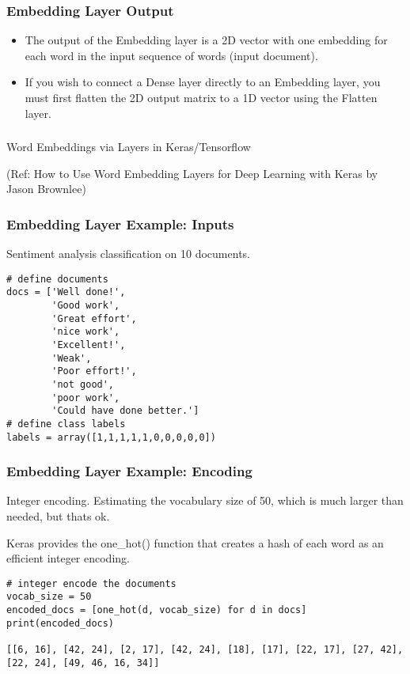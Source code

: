 \begin{frame}[fragile]\frametitle{Embedding Layer Output}

\begin{itemize}
\item The output of the Embedding layer is a 2D vector with one embedding for each word in the input sequence of words (input document).
\item If you wish to connect a Dense layer directly to an Embedding layer, you must first flatten the 2D output matrix to a 1D vector using the Flatten layer.
\end{itemize}

\end{frame}

\begin{frame}[fragile]\frametitle{}
\begin{center}
{\Large Word Embeddings via Layers in Keras/Tensorflow}
\end{center}

{\tiny (Ref: How to Use Word Embedding Layers for Deep Learning with Keras
by Jason Brownlee)}
\end{frame}


\begin{frame}[fragile]\frametitle{Embedding Layer Example: Inputs}

Sentiment analysis classification on 10 documents.

\begin{lstlisting}
# define documents
docs = ['Well done!',
		'Good work',
		'Great effort',
		'nice work',
		'Excellent!',
		'Weak',
		'Poor effort!',
		'not good',
		'poor work',
		'Could have done better.']
# define class labels
labels = array([1,1,1,1,1,0,0,0,0,0])
\end{lstlisting}
\end{frame}


\begin{frame}[fragile]\frametitle{Embedding Layer Example: Encoding}

Integer encoding. Estimating the vocabulary size of 50, which is much larger than needed, but thats ok.

Keras provides the one\_hot() function that creates a hash of each word as an efficient integer encoding.

\begin{lstlisting}
# integer encode the documents
vocab_size = 50
encoded_docs = [one_hot(d, vocab_size) for d in docs]
print(encoded_docs)

[[6, 16], [42, 24], [2, 17], [42, 24], [18], [17], [22, 17], [27, 42], [22, 24], [49, 46, 16, 34]]
\end{lstlisting}
\end{frame}

